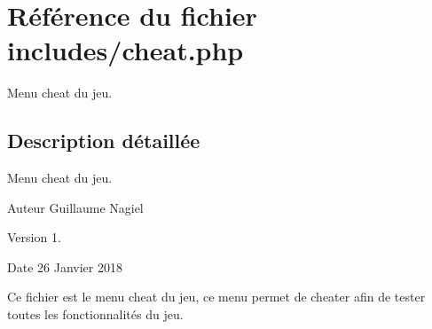 \hypertarget{cheat_8php}{}\section{Référence du fichier includes/cheat.php}
\label{cheat_8php}


Menu cheat du jeu.  




\subsection{Description détaillée}
Menu cheat du jeu. 

\begin{DoxyAuthor}{Auteur}
Guillaume Nagiel 
\end{DoxyAuthor}
\begin{DoxyVersion}{Version}
1. 
\end{DoxyVersion}
\begin{DoxyDate}{Date}
26 Janvier 2018
\end{DoxyDate}
Ce fichier est le menu cheat du jeu, ce menu permet de cheater afin de tester toutes les fonctionnalités du jeu. 